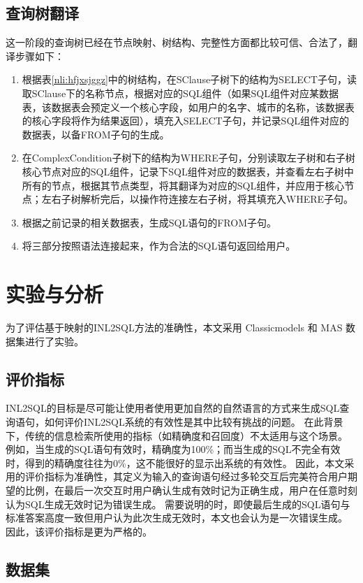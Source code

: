 \subsection{查询树翻译}
\label{nli:cxsfy}
这一阶段的查询树已经在节点映射、树结构、完整性方面都比较可信、合法了，翻译步骤如下：
\begin{enumerate}
    \item 根据表\ref{nli:hfjxsjggz}中的树结构，在SClause子树下的结构为SELECT子句，读取SClause下的名称节点，根据对应的SQL组件（如果SQL组件对应某数据表，该数据表会预定义一个核心字段，如用户的名字、城市的名称，该数据表的核心字段将作为结果返回），填充入SELECT子句，并记录SQL组件对应的数据表，以备FROM子句的生成。
    \item 在ComplexCondition子树下的结构为WHERE子句，分别读取左子树和右子树核心节点对应的SQL组件，记录下SQL组件对应的数据表，并查看左右子树中所有的节点，根据其节点类型，将其翻译为对应的SQL组件，并应用于核心节点；左右子树解析完后，以操作符连接左右子树，将其填充入WHERE子句。
    \item 根据之前记录的相关数据表，生成SQL语句的FROM子句。
    \item 将三部分按照语法连接起来，作为合法的SQL语句返回给用户。
\end{enumerate}

\section{实验与分析}
为了评估基于映射的INL2SQL方法的准确性，本文采用 Classicmodels 和 MAS 数据集进行了实验。
\subsection{评价指标}
INL2SQL的目标是尽可能让使用者使用更加自然的自然语言的方式来生成SQL查询语句，如何评价INL2SQL系统的有效性是其中比较有挑战的问题。
在此背景下，传统的信息检索所使用的指标（如精确度和召回度）不太适用与这个场景。
例如，当生成的SQL语句有效时，精确度为100\%；而当生成的SQL不完全有效时，得到的精确度往往为0\%，这不能很好的显示出系统的有效性。
因此，本文采用的评价指标为准确性，其定义为输入的查询语句经过多轮交互后完美符合用户期望的比例，在最后一次交互时用户确认生成有效时记为正确生成，用户在任意时刻认为SQL生成无效时记为错误生成。
需要说明的时，即使最后生成的SQL语句与标准答案高度一致但用户认为此次生成无效时，本文也会认为是一次错误生成。
因此，该评价指标是更为严格的。

\subsection{数据集}

